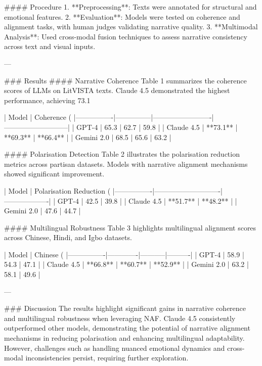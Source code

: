 #### Procedure  
1. **Preprocessing**: Texts were annotated for structural and emotional features.  
2. **Evaluation**: Models were tested on coherence and alignment tasks, with human judges validating narrative quality.  
3. **Multimodal Analysis**: Used cross-modal fusion techniques to assess narrative consistency across text and visual inputs.  

---

### Results  
#### Narrative Coherence  
Table 1 summarizes the coherence scores of LLMs on LitVISTA texts. Claude 4.5 demonstrated the highest performance, achieving 73.1%

| Model          | Coherence (%
|----------------|---------------|-------------------------|---------------------------|  
| GPT-4          | 65.3          | 62.7                   | 59.8                      |  
| Claude 4.5     | **73.1**      | **69.3**               | **66.4**                  |  
| Gemini 2.0     | 68.5          | 65.6                   | 63.2                      |  

#### Polarisation Detection  
Table 2 illustrates the polarisation reduction metrics across partisan datasets. Models with narrative alignment mechanisms showed significant improvement.  

| Model          | Polarisation Reduction (%
|----------------|----------------------------|-------------------|  
| GPT-4          | 42.5                       | 39.8              |  
| Claude 4.5     | **51.7**                   | **48.2**          |  
| Gemini 2.0     | 47.6                       | 44.7              |  

#### Multilingual Robustness  
Table 3 highlights multilingual alignment scores across Chinese, Hindi, and Igbo datasets.  

| Model          | Chinese (%
|----------------|-------------|-----------|----------|  
| GPT-4          | 58.9        | 54.3      | 47.1     |  
| Claude 4.5     | **66.8**    | **60.7**  | **52.9** |  
| Gemini 2.0     | 63.2        | 58.1      | 49.6     |  

---

### Discussion  
The results highlight significant gains in narrative coherence and multilingual robustness when leveraging NAF. Claude 4.5 consistently outperformed other models, demonstrating the potential of narrative alignment mechanisms in reducing polarisation and enhancing multilingual adaptability. However, challenges such as handling nuanced emotional dynamics and cross-modal inconsistencies persist, requiring further exploration.

